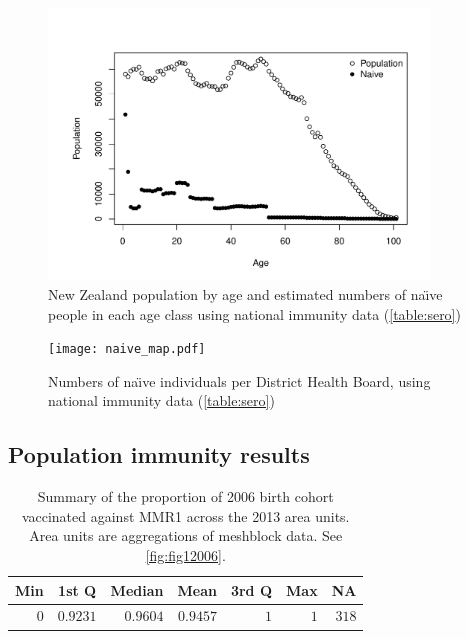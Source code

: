 \documentclass{article}
\begin{document}
\begin{figure}
\begin{center}
     \includegraphics[width=0.9\textwidth]{naive_allPop.pdf}
\end{center}
\caption{New Zealand population by age and estimated numbers of na\"{\i}ve people in each age class using national immunity data (\autoref{table:sero})}
\label{fig:naive}
\end{figure}

\begin{figure}
     \begin{center}
     \texttt{[image: naive\_map.pdf]}
     \end{center}
     \caption{Numbers of na\"{\i}ve individuals per District Health Board, using national immunity data (\autoref{table:sero})}
     \label{fig:naive_map}
\end{figure}

\subsection{Population immunity results}
\label{sub:popim}

 \vspace{5mm} %
\begin{table}
\begin{center}
\begin{tabular}{rrrrrrr}
\hline\hline
\multicolumn{1}{c}{Min}&\multicolumn{1}{c}{1st Q}&\multicolumn{1}{c}{Median}&\multicolumn{1}{c}{Mean}&\multicolumn{1}{c}{3rd Q}&\multicolumn{1}{c}{Max}&\multicolumn{1}{c}{NA}\tabularnewline
\hline
$0$&$0.9231$&$0.9604$&$0.9457$&$1$&$1$&$318$\tabularnewline
\hline
\end{tabular}\end{center}\caption{Summary of the proportion of 2006 birth cohort vaccinated against MMR1 across the 2013 area units. Area units are aggregations of meshblock data. See \autoref{fig:fig12006}.}
\label{table:tab12006}
\end{table}
\end{document}

